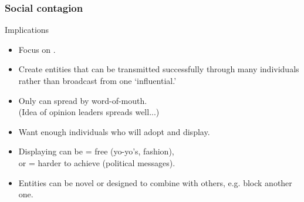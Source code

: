 \begin{frame}
  \frametitle{Social contagion}

  \begin{block}{Implications}
  \begin{itemize}
  \item<1->
    Focus on .
  \item<2->
    Create entities that can be transmitted successfully
    through many individuals rather than broadcast from one `influential.'
  \item<3->
    Only  can spread by word-of-mouth.\\
    \qquad (Idea of opinion leaders spreads well...)
  \item<4->
    Want enough individuals who will adopt and display.
  \item<5->
    Displaying can be  = free (yo-yo's, fashion),\\
    or  = harder to achieve (political messages).
  \item<6->
    Entities can be novel or designed to combine with others,
    e.g. block another one.
  \end{itemize}
  \end{block}

\end{frame}





